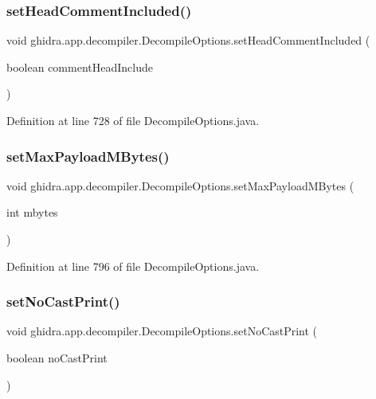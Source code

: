\subsubsection{\texorpdfstring{setHeadCommentIncluded()}{setHeadCommentIncluded()}}
{\footnotesize\ttfamily void ghidra.\+app.\+decompiler.\+Decompile\+Options.\+set\+Head\+Comment\+Included (\begin{DoxyParamCaption}\item[{boolean}]{comment\+Head\+Include }\end{DoxyParamCaption})\hspace{0.3cm}{\ttfamily [inline]}}



Definition at line 728 of file Decompile\+Options.\+java.

\mbox{\label{classghidra_1_1app_1_1decompiler_1_1_decompile_options_a83fc3795526ec5383ae45c10ec555b48}} 
\subsubsection{\texorpdfstring{setMaxPayloadMBytes()}{setMaxPayloadMBytes()}}
{\footnotesize\ttfamily void ghidra.\+app.\+decompiler.\+Decompile\+Options.\+set\+Max\+Payload\+M\+Bytes (\begin{DoxyParamCaption}\item[{int}]{mbytes }\end{DoxyParamCaption})\hspace{0.3cm}{\ttfamily [inline]}}



Definition at line 796 of file Decompile\+Options.\+java.

\mbox{\label{classghidra_1_1app_1_1decompiler_1_1_decompile_options_a107bd7421ca555369a298b60c2398450}} 
\subsubsection{\texorpdfstring{setNoCastPrint()}{setNoCastPrint()}}
{\footnotesize\ttfamily void ghidra.\+app.\+decompiler.\+Decompile\+Options.\+set\+No\+Cast\+Print (\begin{DoxyParamCaption}\item[{boolean}]{no\+Cast\+Print }\end{DoxyParamCaption})\hspace{0.3cm}{\ttfamily [inline]}}



